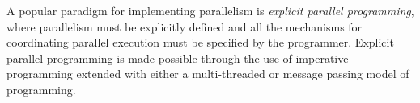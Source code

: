 \begin{comment}
Parallelism has been traditionally classified into two classes: \emph{data
parallelism} and \emph{task parallelism}. In data parallelism, the data is
partitioned among the processing units and each unit performs the same
computation on their piece of data. In task parallelism, the program is split
into different tasks that are then assigned to processing units. If the data or
tasks are well-defined, relatively independent and regular (i.e., they take the
same amount of time to be completed) then parallelization can be trivial.
However, issues arise when it is hard to partition the tasks or the tasks that
need to be completed are not static but are dynamically generated during
execution. To complicate matters even further, some tasks may depend on other
tasks being completed in order to be started. In such situations, the programmer
is required to implement a \emph{scheduler} that efficiently assigns tasks to
processing units and is able to \emph{balance} the load among those units. A
scheduler may use a \emph{centralized strategy} where there is a \emph{master}
processing unit that makes work distribution decisions or the scheduler uses a
\emph{distributed strategy} where each processing unit is able to perform
\emph{work stealing} or \emph{work sharing}~\cite{Blumofe:1999} on other units
to improve load balance.
\end{comment}

A popular paradigm for implementing parallelism is \emph{explicit parallel
programming}, where parallelism must be explicitly defined and all the
mechanisms for coordinating parallel execution must be specified by the
programmer. Explicit parallel programming is made possible through the use of
imperative programming extended with either a multi-threaded or message passing
model of programming.

